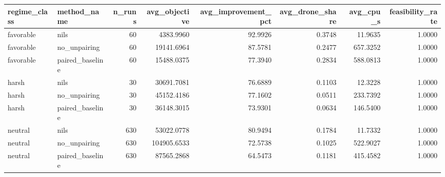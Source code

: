 \begin{tabular}{llrrrrrr}
\toprule
regime_class & method_name & n_runs & avg_objective & avg_improvement_pct & avg_drone_share & avg_cpu_s & feasibility_rate \\
\midrule
favorable & nils & 60 & 4383.9960 & 92.9926 & 0.3748 & 11.9635 & 1.0000 \\
favorable & no_unpairing & 60 & 19141.6964 & 87.5781 & 0.2477 & 657.3252 & 1.0000 \\
favorable & paired_baseline & 60 & 15488.0375 & 77.3940 & 0.2834 & 588.0813 & 1.0000 \\
harsh & nils & 30 & 30691.7081 & 76.6889 & 0.1103 & 12.3228 & 1.0000 \\
harsh & no_unpairing & 30 & 45152.4186 & 77.1602 & 0.0511 & 233.7392 & 1.0000 \\
harsh & paired_baseline & 30 & 36148.3015 & 73.9301 & 0.0634 & 146.5400 & 1.0000 \\
neutral & nils & 630 & 53022.0778 & 80.9494 & 0.1784 & 11.7332 & 1.0000 \\
neutral & no_unpairing & 630 & 104905.6533 & 72.5738 & 0.1025 & 522.9027 & 1.0000 \\
neutral & paired_baseline & 630 & 87565.2868 & 64.5473 & 0.1181 & 415.4582 & 1.0000 \\
\bottomrule
\end{tabular}
